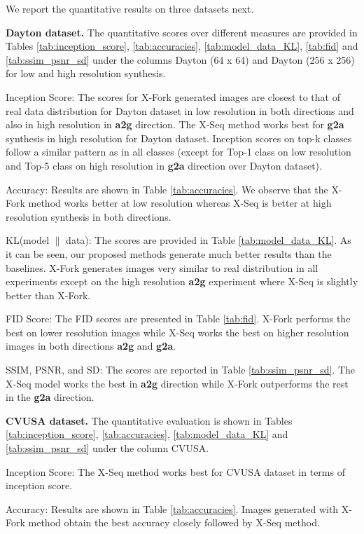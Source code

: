 \documentclass[times,twocolumn,final,authoryear]{elsarticle_modified}
\begin{document}
We report the quantitative results on three datasets next. 

\noindent \textbf{Dayton dataset.} The quantitative scores over different measures are provided in Tables \ref{tab:inception_score}, \ref{tab:accuracies}, \ref{tab:model_data_KL}, \ref{tab:fid} and \ref{tab:ssim_psnr_sd} under the columns Dayton (64 x 64) and Dayton (256 x 256) for low and high resolution synthesis. 


Inception Score: The scores for X-Fork generated images are closest to that of real data distribution for Dayton dataset in low resolution in both directions and also in high resolution in \textbf{a2g} direction. The X-Seq method works best for \textbf{g2a} synthesis in high resolution for Dayton dataset. Inception scores on top-k classes follow a similar pattern as in all classes (except for Top-1 class on low resolution and Top-5 class on high resolution in \textbf{g2a} direction over Dayton dataset).

Accuracy: Results are shown in Table \ref{tab:accuracies}. We observe that the X-Fork method works better at low resolution whereas X-Seq is better at high resolution synthesis in both directions.

KL(model $\|$ data):
The scores are provided in Table \ref{tab:model_data_KL}. As it can be seen, our proposed methods generate much better results than the baselines. X-Fork generates images very similar to real distribution in all experiments except on the high resolution \textbf{a2g} experiment where X-Seq is slightly better than X-Fork. 

{FID Score:} The FID scores are presented in Table \ref{tab:fid}. X-Fork performs the best on lower resolution images while X-Seq works the best on higher resolution images in both directions \textbf{a2g} and \textbf{g2a}.  


{SSIM, PSNR, and SD:}
The scores are reported in Table \ref{tab:ssim_psnr_sd}. The X-Seq model works the best in \textbf{a2g} direction while X-Fork outperforms the rest in the \textbf{g2a} direction.

\noindent \textbf{CVUSA dataset.} The quantitative evaluation is shown in Tables \ref{tab:inception_score}, \ref{tab:accuracies}, \ref{tab:model_data_KL} and \ref{tab:ssim_psnr_sd} under the column CVUSA. 


Inception Score: The X-Seq method works best for CVUSA dataset in terms of inception score.

Accuracy: Results are shown in Table \ref{tab:accuracies}. Images generated with X-Fork method obtain the best accuracy closely followed by X-Seq method.
\end{document}
